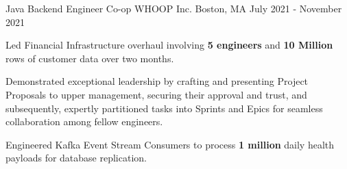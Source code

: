 \begin{cventries}
  \cventry
    {Java Backend Engineer Co-op} %
    {WHOOP Inc.} %
    {Boston, MA} %
    {July 2021 - November 2021} %
    {
      \begin{cvitems} %
        \item {Led Financial Infrastructure overhaul involving \textbf{5 engineers} and \textbf{10 Million} rows of customer data over two months.}
        \item {Demonstrated exceptional leadership by crafting and presenting Project Proposals to upper management, securing their approval and trust, and subsequently, expertly partitioned tasks into Sprints and Epics for seamless collaboration among fellow engineers.}
        \item {Engineered Kafka Event Stream Consumers to process \textbf{1 million} daily health payloads for database replication.}
      \end{cvitems}
    }
    

\end{cventries}
